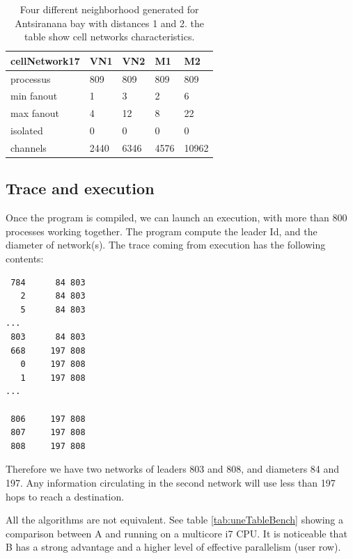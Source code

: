 \begin{table}[htb]
\begin{center}
\begin{tabular}{|l|l|ll|l||}\hline
cellNetwork17 & VN1 &   VN2 &   M1 &    M2\\\hline
processus  &    809 &   809 &   809 &   809\\\hline
min fanout  &   1 &     3 &     2 &     6\\\hline
max fanout  &   4 &     12 &    8 &     22\\\hline
isolated    &   0 &     0 &     0 &     0\\\hline
channels    &   2440 &  6346 &  4576 &  10962\\\hline
\end{tabular}
\caption{ Four different neighborhood generated for Antsiranana bay with distances 1 and 2.
the table show  cell  networks characteristics. }
\label{tab:uneCATable}
\end{center}
\end{table}


\subsection{ Trace and execution }

Once the program is compiled, we can launch an execution, with more than 800 processes
working together. The program compute the leader Id, and the diameter of network(s).
The trace coming from execution has the following contents:

\begin{lstlisting}
 784	  84 803
   2	  84 803
   5	  84 803
...
 803	  84 803
 668	 197 808
   0	 197 808
   1	 197 808
...

 806	 197 808
 807	 197 808
 808	 197 808
\end{lstlisting}

Therefore we have two networks of leaders 803 and 808, and diameters 84 and 197.
Any information circulating in the second network will use less than 197 hops to
reach a destination.

All the algorithms  are not equivalent. See table \ref{tab:uneTableBench} showing a comparison between A and 
running on a multicore i7 CPU. It is noticeable that B has a strong advantage and a higher level
of effective parallelism (user row).

